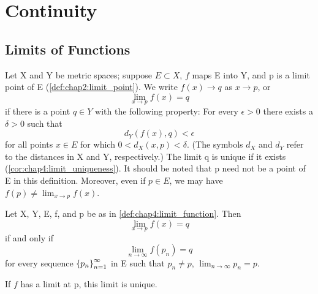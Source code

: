 
\chapter{Continuity}
\label{chap:rudin4}

\section{Limits of Functions}
\label{sec:chap4:limits_functions}

\begin{definition} %
  \label{def:chap4:limit_function}
  Let X and Y be metric spaces; suppose $E \subset X$, $f$ maps E
  into Y, and p is a limit point of E
  (\autoref{def:chap2:limit_point}). We write $f(x) \to q$ as $x \to p$, or
  \[ \lim_{x \to p} f(x) = q \]
  if there is a point $q \in Y$ with the following property: For
  every $\epsilon > 0$ there exists a $\delta > 0$ such that
  \[ d_Y(f(x), q) < \epsilon \]
  for all points $x \in E$ for which $0 < d_X(x, p) < \delta$.
  (The symbols $d_X$ and $d_Y$ refer to the distances in X and Y, respectively.)
  The limit q is unique if it exists (\autoref{cor:chap4:limit_uniqueness}).
  It should be noted that p need not be a point of E in this
  definition. Moreover, even if $p \in E$, we may have $f(p) \ne
  \lim_{x \to p} f(x)$.
\end{definition}

\begin{theorem} %
  \label{thm:chap4:limit_via_sequences}
  Let X, Y, E, f, and p be as in \autoref{def:chap4:limit_function}. Then
  \[ \lim_{x \to p} f(x) = q \]
  if and only if
  \[ \lim_{n \to \infty} f(p_n) = q \]
  for every sequence $\left\{ p_n \right\}_{n=1}^\infty$ in E such that $p_n \ne p$,
  $\lim_{n \to \infty} p_n = p$.
\end{theorem}

\begin{corollary} %
  \label{cor:chap4:limit_uniqueness}
  If $f$ has a limit at p, this limit is unique.
\end{corollary}

